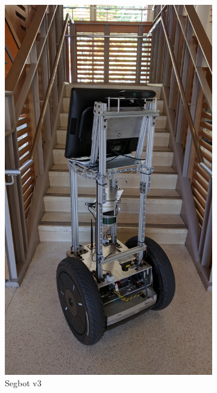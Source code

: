 \documentclass[
  oneside,
  11pt, a4paper,
  footinclude=true,
  headinclude=true,
  cleardoublepage=empty
]{article}
\begin{document}
\begin{figure}[!tbp]
\begin{subfigure}[b]{0.3\textwidth}
    \includegraphics[width=\textwidth]{bwi_segbot3}
    \caption{Segbot v3}
    \label{fig:segbotv3}
  \end{subfigure}
  \hfill
  \begin{subfigure}[b]{0.3\textwidth}

\end{subfigure}
\end{figure}
\end{document}
